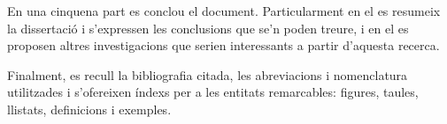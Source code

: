 En una cinquena part es conclou el document. Particularment en el
 es resumeix la dissertació i s'expressen les
conclusions que se'n poden treure, i en el  es
proposen altres investigacions que serien interessants a partir
d'aquesta recerca.




Finalment, es recull la bibliografia citada, les abreviacions i
nomenclatura utilitzades i s'ofereixen índexs per a les entitats
remarcables: figures, taules, llistats, definicions i exemples.






















